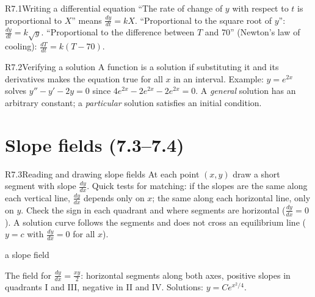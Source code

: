 \documentclass{apcalc}
\begin{document}
\begin{rulebox}{R7.1}{Writing a differential equation}
``The rate of change of $y$ with respect to $t$ is proportional to $X$'' means $\frac{dy}{dt}=kX$. ``Proportional to the square root of $y$'': $\frac{dy}{dt}=k\sqrt y$. ``Proportional to the difference between $T$ and 70'' (Newton's law of cooling): $\frac{dT}{dt}=k(T-70)$.
\end{rulebox}

\begin{rulebox}{R7.2}{Verifying a solution}
A function is a solution if substituting it and its derivatives makes the equation true for all $x$ in an interval. Example: $y=e^{2x}$ solves $y''-y'-2y=0$ since $4e^{2x}-2e^{2x}-2e^{2x}=0$. A \emph{general} solution has an arbitrary constant; a \emph{particular} solution satisfies an initial condition.
\end{rulebox}

\section{Slope fields (7.3--7.4)}

\begin{rulebox}{R7.3}{Reading and drawing slope fields}
At each point $(x,y)$ draw a short segment with slope $\frac{dy}{dx}$. Quick tests for matching: if the slopes are the same along each vertical line, $\frac{dy}{dx}$ depends only on $x$; the same along each horizontal line, only on $y$. Check the sign in each quadrant and where segments are horizontal ($\frac{dy}{dx}=0$). A solution curve follows the segments and does not cross an equilibrium line ($y=c$ with $\frac{dy}{dx}=0$ for all $x$).
\end{rulebox}

\begin{example}{a slope field}
\begin{center}
\end{center}
The field for $\frac{dy}{dx}=\frac{xy}{2}$: horizontal segments along both axes, positive slopes in quadrants I and III, negative in II and IV. Solutions: $y=Ce^{x^2/4}$.
\end{example}
\end{document}

